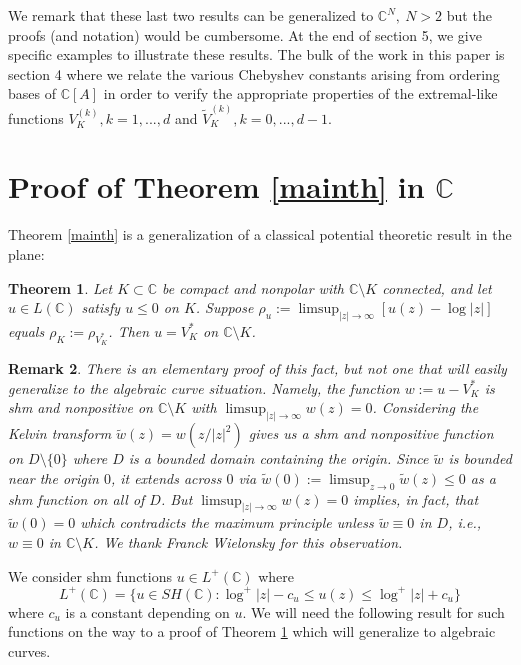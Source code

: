 \documentclass[12pt]{article}
\numberwithin{equation}{section}
\newtheorem{theorem}{Theorem}[section]
\newtheorem{Remark}[theorem]{Remark}
\newenvironment{remark}{\begin{Remark}\rm}{\end{Remark}}
\newcommand{\C}{\mathbb{C}}
\renewcommand{\tilde}{\widetilde}
\begin{document}
We remark that these last two results can be generalized to $\C^N, \ N>2$ but the proofs (and notation) would be cumbersome.  At the end of section 5, we give specific examples to illustrate these results. The bulk of the work in this paper is section 4 where we relate the various Chebyshev constants arising from ordering bases of $\C[A]$ in order to verify the appropriate properties of the extremal-like functions $V_{K}^{(k)}, k=1,...,d$ and $\tilde V_{K}^{(k)}, k=0,...,d-1$. 






\section{Proof of Theorem \ref{mainth} in $\C$} Theorem \ref{mainth} is a generalization of a classical potential theoretic result in the plane:

\begin{theorem} \label{inplane} Let $K\subset \C$ be compact and nonpolar with $\C \setminus K$ connected, and let $u\in L(\C)$ satisfy $u\leq 0$ on $K$. Suppose $\rho_u:=\limsup_{|z|\to \infty}[u(z)-\log |z|]$ equals $\rho_K:=\rho_{V_K^*}$. Then $u=V_K^*$ on $\C \setminus K$.

\end{theorem} 

\begin{remark} There is an elementary proof of this fact, but not one that will easily generalize to the  algebraic curve situation. Namely, the function $w:=u-V_K^*$ is shm and nonpositive on $\C\setminus K$ with $\limsup_{|z|\to \infty} w(z)=0$. Considering the Kelvin transform $\tilde w(z) = w(z/|z|^2)$ gives us a shm and nonpositive function on $D\setminus \{0\}$ where $D$ is a bounded domain containing the origin. Since $\tilde w$ is bounded near the origin $0$, it extends across $0$ via $\tilde w(0):=\limsup_{z\to 0} \tilde w(z) \leq 0$ as a shm function on all of $D$. But $\limsup_{|z|\to \infty} w(z)=0$ implies, in fact, that $\tilde w(0)=0$ which contradicts the maximum principle unless $\tilde w\equiv 0$ in $D$, i.e., $w\equiv 0$ in $\C\setminus K$. We thank Franck Wielonsky for this observation.
\end{remark}

We consider shm functions $u \in L^+(\C)$ where
$$L^+(\C)=\{u\in SH(\C): \log^+|z|-c_u \leq u(z) \leq \log^+|z|+c_u\}$$
where $c_u$ is a constant depending on $u$. We will need the following result for such functions on the way to a proof of Theorem \ref{inplane} which will generalize to algebraic curves.  
\end{document}
